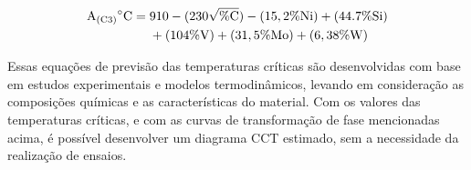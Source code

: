 \begin{equation}
    \label{eq:A_C3}
    \begin{aligned}
    \mathrm{A\textsubscript{(C3)}}^{\circ}\mathrm{C} = {}   & 910 - (230\sqrt{\%\mathrm{C}}) - (15,2\%\mathrm{Ni}) + (44.7\%\mathrm{Si})\\
                                                            & + (104\%\mathrm{V}) + (31,5\%\mathrm{Mo}) + (6,38\%\mathrm{W})
\end{aligned}
\end{equation}
\par
Essas equações de previsão das temperaturas críticas são desenvolvidas com base em estudos experimentais e modelos termodinâmicos, levando em consideração as composições químicas e as características do material. Com os valores das temperaturas críticas, e com as curvas de transformação de fase mencionadas acima, é possível desenvolver um diagrama CCT estimado, sem a necessidade da realização de ensaios.
